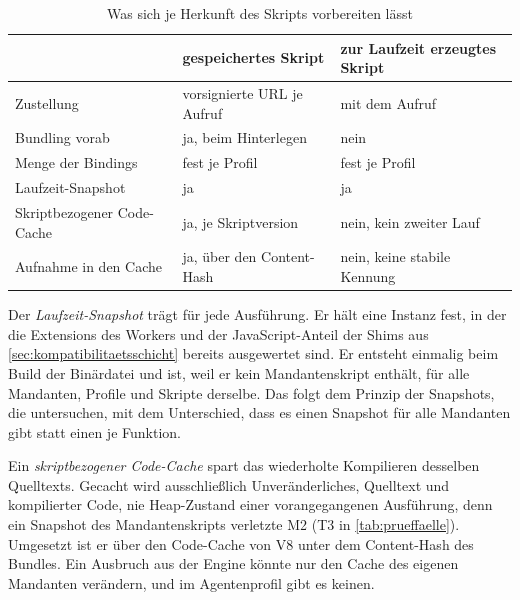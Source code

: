 \begin{table}[H]
  \caption{Was sich je Herkunft des Skripts vorbereiten lässt}
  \label{tab:vorbereitung}
  \small
  \begin{tabularx}{\textwidth}{@{}>{\RaggedRight\arraybackslash}p{}
    >{\RaggedRight\arraybackslash}X >{\RaggedRight\arraybackslash}X@{}}
    \hline
     & gespeichertes Skript & zur Laufzeit erzeugtes Skript \\
    \hline
    Zustellung & vorsignierte \acs{URL} je Aufruf & mit dem Aufruf \\[2pt]
    Bundling vorab & ja, beim Hinterlegen & nein \\[2pt]
    Menge der Bindings & fest je Profil & fest je Profil \\[2pt]
    Laufzeit-Snapshot & ja & ja \\[2pt]
    Skriptbezogener Code-Cache & ja, je Skriptversion & nein, kein zweiter Lauf \\[2pt]
    Aufnahme in den Cache & ja, über den Content-Hash & nein, keine stabile Kennung \\
    \hline
  \end{tabularx}
\end{table}

Der \emph{Laufzeit-Snapshot} trägt für jede Ausführung. Er hält eine Instanz fest, in der die Extensions des Workers
und der JavaScript-Anteil der Shims aus \autoref{sec:kompatibilitaetsschicht} bereits ausgewertet sind. Er entsteht
einmalig beim Build der Binärdatei und ist, weil er kein Mandantenskript enthält, für alle Mandanten, Profile und
Skripte derselbe. Das folgt dem Prinzip der Snapshots, die \textcite[S.~559]{ustiugov_benchmarking_2021} untersuchen, mit dem Unterschied, dass es einen Snapshot für alle Mandanten gibt statt einen je Funktion.

Ein \emph{skriptbezogener Code-Cache} spart das wiederholte Kompilieren desselben Quelltexts. Gecacht wird ausschließlich
Unveränderliches, Quelltext und kompilierter Code, nie Heap-Zustand einer vorangegangenen Ausführung, denn ein
Snapshot des Mandantenskripts verletzte M2 (T3 in \autoref{tab:prueffaelle}). Umgesetzt ist er über den Code-Cache
von V8 unter dem Content-Hash des Bundles. Ein Ausbruch aus der Engine könnte nur den Cache des eigenen Mandanten verändern, und im Agentenprofil gibt es keinen.

